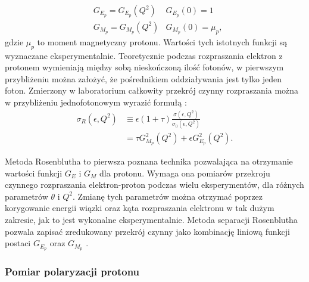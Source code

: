 \documentclass[11pt]{book}
\theoremstyle{definition}
\begin{document}
\begin{eqnarray*}
 &G_{E_p} = G_{E_p}(Q^2)  &G_{E_p}(0) = 1\\
 &G_{M_p} = G_{M_p}(Q^2)  &G_{M_p}(0) = \mu_p, 
\end{eqnarray*}
gdzie $\mu_p$ to moment magnetyczny protonu. Wartości tych istotnych funkcji są wyznaczane eksperymentalnie. Teoretycznie podczas rozpraszania elektron z protonem wymieniają między sobą nieskończoną ilość fotonów, w pierwszym przybliżeniu można założyć, że pośrednikiem oddziaływania jest tylko jeden foton. Zmierzony w laboratorium całkowity przekrój czynny rozpraszania można w przybliżeniu jednofotonowym wyrazić formułą \cite{2009PhRvC..79f5204A}:
% 
\begin{equation}
\begin{split}
\sigma_R(\epsilon, Q^2) &\equiv \epsilon \left(1 + \tau \right) \frac{\sigma \left(\epsilon,Q^2\right)}{\sigma_0\left(\epsilon, Q^2\right) }\\
&=\tau G_{M_p}^2(Q^2) + \epsilon G_{E_p}^2(Q^2).
\end{split} \label{eq:rosen}
\end{equation}

Metoda Rosenblutha to pierwsza poznana technika pozwalająca na otrzymanie wartości funkcji $G_E$ i $G_M$ dla protonu. Wymaga ona pomiarów przekroju czynnego rozpraszania elektron-proton podczas wielu eksperymentów, dla różnych parametrów $\theta$ i $Q^2$. Zmianę tych parametrów można otrzymać poprzez korygowanie energii wiązki oraz kąta rozpraszania elektronu w tak dużym zakresie, jak to jest wykonalne eksperymentalnie. Metoda separacji Rosenblutha pozwala zapisać zredukowany przekrój czynny jako kombinację liniową funkcji postaci $G_{E_p}$ oraz $G_{M_p}$ \cite{2007PrPNP..59..694P}.
%

\subsubsection{Pomiar polaryzacji protonu}
\end{document}
